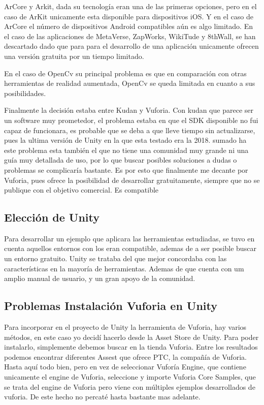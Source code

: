 ArCore y Arkit, dada su tecnología eran una de las primeras opciones, pero en el caso de ArKit unicamente esta disponible para dispositivos iOS. Y en el caso de ArCore el número de dispositivos Android compatibles aún es algo limitado.
En el caso de las aplicaciones de MetaVerse, ZapWorks, WikiTude y 8thWall, se han descartado dado que para para el desarrollo de una aplicación unicamente ofrecen una versión gratuita por un tiempo limitado.

En el caso de OpenCv su principal problema es que en comparación con otras herramientas de realidad aumentada, OpenCv se queda limitada en cuanto a sus posibilidades.

Finalmente la decisión estaba entre Kudan y Vuforia. Con kudan que parece ser un software muy prometedor, el problema estaba en que el SDK disponible no fui capaz de funcionara, es probable que se deba a que lleve tiempo sin actualizarse, pues la ultima versión de Unity en la que esta testado era la 2018. sumado ha este problema esta también el que no tiene una comunidad muy grande ni una guía muy detallada de uso, por lo que buscar posibles soluciones a dudas o problemas se complicaría bastante.
Es por esto que finalmente me decante por Vuforia, pues  ofrece la posibilidad de desarrollar gratuitamente, siempre que no se publique con el objetivo comercial. Es compatible 


\subsection{Elección de Unity}
Para desarrollar un ejemplo que aplicara las herramientas estudiadas, se tuvo en cuenta aquellos entornos con los eran compatible, ademas de a ser posible buscar un entorno gratuito. Unity se trataba del que mejor concordaba con las características en la mayoría de herramientas. Ademas de que cuenta con um amplio manual de usuario, y un gran apoyo de la comunidad.

\subsection{Problemas Instalación Vuforia en Unity}
Para incorporar en el proyecto de Unity la herramienta de Vuforia, hay varios métodos, en este caso yo decidí hacerlo desde la Asset Store de Unity. Para poder instalarlo, simplemente debemos buscar en la tienda Vuforia. Entre los resultados podemos encontrar diferentes Assest que ofrece PTC, la compañía de Vuforia. Hasta aquí todo bien, pero en vez de seleccionar Vuforía Engine, que contiene unicamente el engine de Vuforia, seleccione y importe Vuforia Core Samples, que se trata del engine de Vuforia pero viene con múltiples ejemplos desarrollados de vuforia. De este hecho no percaté hasta bastante mas adelante. 

